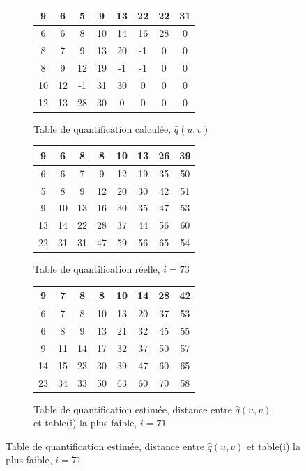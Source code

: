\documentclass[utf8,final]{stageM2R} %
\begin{document}
\begin{figure}
  \begin{subfigure}{.5\textwidth}
    \centering
    \begin{tabular}{|c|c|c|c|c|c|c|c|}
      \hline
      9 & 6 & 5 & 9 & 13 & 22 & 22 & 31 \\ \hline    
      6 & 6 & 8 & 10 & 14 & 16 & 28 & 0 \\ \hline
      8 & 7 & 9 & 13 & 20 & -1 & 0 & 0 \\ \hline
      8 & 9 & 12 & 19 & -1 & -1 & 0 & 0 \\ \hline
      10 & 12 & -1 & 31 & 30 & 0 & 0 & 0 \\ \hline
      12 & 13 & 28 & 30 & 0 & 0 & 0 & 0 \\ \hline
    \end{tabular}
    \caption{Table de quantification calculée, $\widehat{q}(u,v)$}
    \label{periods1}
  \end{subfigure}
  \begin{subfigure}{.5\textwidth}
    \centering
    \begin{tabular}{|c|c|c|c|c|c|c|c|}
      \hline
      9 & 6 & 8 & 8 & 10 & 13 & 26 & 39  \\ \hline
      6 & 6 & 7 & 9 & 12 & 19 & 35 & 50  \\ \hline
      5 & 8 & 9 & 12 & 20 & 30 & 42 & 51  \\ \hline
      9 & 10 & 13 & 16 & 30 & 35 & 47 & 53  \\ \hline
      13 & 14 & 22 & 28 & 37 & 44 & 56 & 60  \\ \hline
      22 & 31 & 31 & 47 & 59 & 56 & 65 & 54  \\ \hline
    \end{tabular}
    \caption{Table de quantification réelle, $i = 73$}
    \label{periods3}
  \end{subfigure}
\vspace{5mm}

  \begin{subfigure}{.5\textwidth}
    \centering
    \begin{tabular}{|c|c|c|c|c|c|c|c|}
      \hline
      9 & 7 & 8 & 8 & 10 & 14 & 28 & 42 \\ \hline
      6 & 7 & 8 & 10 & 13 & 20 & 37 & 53 \\ \hline
      6 & 8 & 9 & 13 & 21 & 32 & 45 & 55 \\ \hline
      9 & 11 & 14 & 17 & 32 & 37 & 50 & 57 \\ \hline
      14 & 15 & 23 & 30 & 39 & 47 & 60 & 65 \\ \hline
      23 & 34 & 33 & 50 & 63 & 60 & 70 & 58 \\ \hline
    \end{tabular}
    \caption{Table de quantification estimée, distance entre $\widehat{q}(u,v)$ et table(i) la plus faible, $i = 71$}
    \label{periods2}
  \end{subfigure}

\end{figure}
\end{document}
